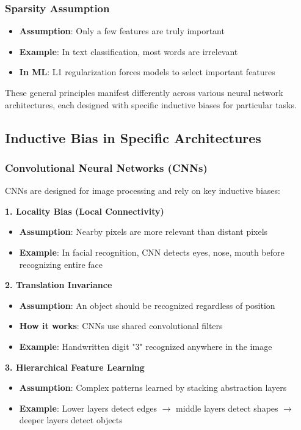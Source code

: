 \subsubsection{Sparsity Assumption}
\begin{itemize}
    \item \textbf{Assumption}: Only a few features are truly important
    \item \textbf{Example}: In text classification, most words are irrelevant
    \item \textbf{In ML}: L1 regularization forces models to select important features
\end{itemize}

These general principles manifest differently across various neural network architectures, each designed with specific inductive biases for particular tasks.

\subsection{Inductive Bias in Specific Architectures}
\subsubsection{Convolutional Neural Networks (CNNs)}
CNNs are designed for image processing and rely on key inductive biases:

\textbf{1. Locality Bias (Local Connectivity)}
\begin{itemize}
    \item \textbf{Assumption}: Nearby pixels are more relevant than distant pixels
    \item \textbf{Example}: In facial recognition, CNN detects eyes, nose, mouth before recognizing entire face
\end{itemize}

\textbf{2. Translation Invariance}
\begin{itemize}
    \item \textbf{Assumption}: An object should be recognized regardless of position
    \item \textbf{How it works}: CNNs use shared convolutional filters
    \item \textbf{Example}: Handwritten digit "3" recognized anywhere in the image
\end{itemize}

\textbf{3. Hierarchical Feature Learning}
\begin{itemize}
    \item \textbf{Assumption}: Complex patterns learned by stacking abstraction layers
    \item \textbf{Example}: Lower layers detect edges $\rightarrow$ middle layers detect shapes $\rightarrow$ deeper layers detect objects
\end{itemize}

